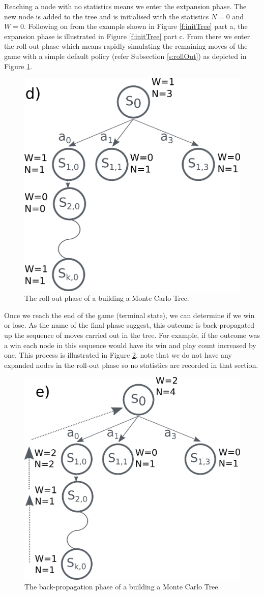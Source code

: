 \documentclass{bhamthesis}
\theoremstyle{definition}
\begin{document}
Reaching a node with no statistics means we enter the extpansion phase. The new node is added to the tree and is initialised with the statistics $N=0$ and $W=0$. Following on from the example shown in Figure \ref{f:initTree} part a, the expansion phase is illustrated in Figure \ref{f:initTree} part c. From there we enter the roll-out phase which means rapidly simulating the remaining moves of the game with a simple default policy (refer Subsection \ref{s:rollOut}) as depicted in Figure \ref{f:treeRollout}.
\begin{figure}
	\centering
	\includegraphics[width=.4\textwidth]{media/img/mctsTreeBuildPartTwo}
	\caption{The roll-out phase of a building a Monte Carlo Tree.}\label{f:treeRollout}
\end{figure} 
Once we reach the end of the game (terminal state), we can determine if we win or lose. As the name of the final phase suggest, this outcome is back-propagated up the sequence of moves carried out in the tree. For example, if the outcome was a win each node in this sequence would have its win and play count increased by one. This process is illustrated in Figure \ref{f:treeBackprop}, note that we do not have any expanded nodes in the roll-out phase so no statistics are recorded in that section.

\begin{figure}
	\centering
	\includegraphics[width=.4\textwidth]{media/img/mctsTreeBuildPartThree}
	\caption{The back-propagation phase of a building a Monte Carlo Tree.}\label{f:treeBackprop}
\end{figure}
\end{document}
